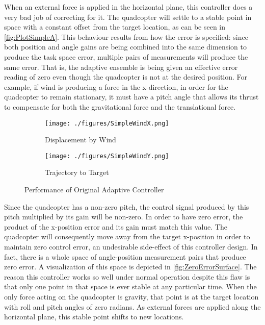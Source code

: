 \documentclass[letterpaper,12pt,titlepage,oneside,final]{book}
\begin{document}
When an external force is applied in the horizontal plane, this controller does a very bad job of correcting for it. 
The quadcopter will settle to a stable point in space with a constant offset from the target location, as can be seen in \autoref{fig:PlotSimpleA}. 
This behaviour results from how the error is specified:
since both position and angle gains are being combined into the same dimension to produce the task space error, multiple pairs of measurements will produce the same error. 
That is, the adaptive ensemble is being given an effective error reading of zero even though the quadcopter is not at the desired position. 
For example, if wind is producing a force in the x-direction, in order for the quadcopter to remain stationary, it must have a pitch angle that allows its thrust to compensate for both the gravitational force and the translational force.

\begin{figure}
\centering
\begin{subfigure}[t]{0.48\textwidth}
\texttt{[image: ./figures/SimpleWindX.png]} %
\caption{Displacement by Wind}
\label{fig:PlotSimpleA}
\end{subfigure}
\begin{subfigure}[t]{0.48\textwidth}
\texttt{[image: ./figures/SimpleWindY.png]}
\caption{Trajectory to Target}
\label{fig:PlotSimpleB}
\end{subfigure}
\caption{Performance of Original Adaptive Controller}
\label{fig:PlotSimple}
\end{figure}


Since the quadcopter has a non-zero pitch, the control signal produced by this pitch multiplied by its gain will be non-zero. 
In order to have zero error, the product of the x-position error and its gain must match this value. 
The quadcopter will consequently move away from the target x-position in order to maintain zero control error, an undesirable side-effect of this controller design. 
In fact, there is a whole space of angle-position measurement pairs that produce zero error.
A visualization of this space is depicted in \autoref{fig:ZeroErrorSurface}. 
The reason this controller works so well under normal operation despite this flaw is that only one point in that space is ever stable at any particular time. 
When the only force acting on the quadcopter is gravity, that point is at the target location with roll and pitch angles of zero radians. 
As external forces are applied along the horizontal plane, this stable point shifts to new locations.
\end{document}
